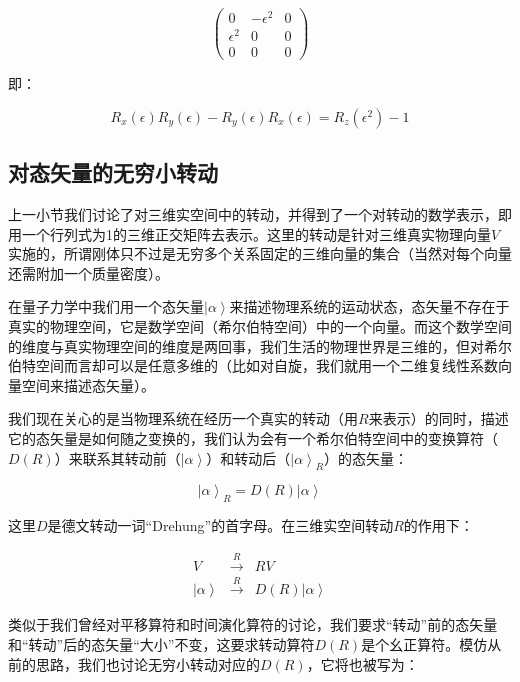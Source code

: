 \begin{equation*}
\left( \begin{array}{ccc}  0 & - \epsilon^2 & 0 \\  \epsilon^2 & 0 & 0 \\ 0 & 0 & 0 \end{array} \right)
\end{equation*}

即：

\begin{equation}
R_x (\epsilon) R_y (\epsilon) - R_y (\epsilon) R_x (\epsilon) = R_z ( \epsilon^2 ) - 1
\end{equation}

\subsection{对态矢量的无穷小转动}

上一小节我们讨论了对三维实空间中的转动，并得到了一个对转动的数学表示，即用一个行列式为1的三维正交矩阵去表示。这里的转动是针对三维真实物理向量$V$实施的，所谓刚体只不过是无穷多个关系固定的三维向量的集合（当然对每个向量还需附加一个质量密度）。

在量子力学中我们用一个态矢量$\left| \alpha \right\rangle$来描述物理系统的运动状态，态矢量不存在于真实的物理空间，它是数学空间（希尔伯特空间）中的一个向量。而这个数学空间的维度与真实物理空间的维度是两回事，我们生活的物理世界是三维的，但对希尔伯特空间而言却可以是任意多维的（比如对自旋，我们就用一个二维复线性系数向量空间来描述态矢量）。

我们现在关心的是当物理系统在经历一个真实的转动（用$R$来表示）的同时，描述它的态矢量是如何随之变换的，我们认为会有一个希尔伯特空间中的变换算符（$D(R)$）来联系其转动前（$\left| \alpha \right\rangle$）和转动后（$\left| \alpha \right\rangle_R$）的态矢量：

\begin{equation}
\left| \alpha \right\rangle_R = D(R) \left| \alpha \right\rangle
\end{equation}

这里$D$是德文转动一词“Drehung”的首字母。在三维实空间转动$R$的作用下：

\begin{eqnarray*}
V  &  \xrightarrow {R}  &   RV \\
\left| \alpha \right\rangle   &   \xrightarrow {R}  &  D(R)  \left| \alpha \right\rangle 
\end{eqnarray*}

类似于我们曾经对平移算符和时间演化算符的讨论，我们要求“转动”前的态矢量和“转动”后的态矢量“大小”不变，这要求转动算符$D(R)$是个幺正算符。模仿从前的思路，我们也讨论无穷小转动对应的$D(R)$，它将也被写为：

